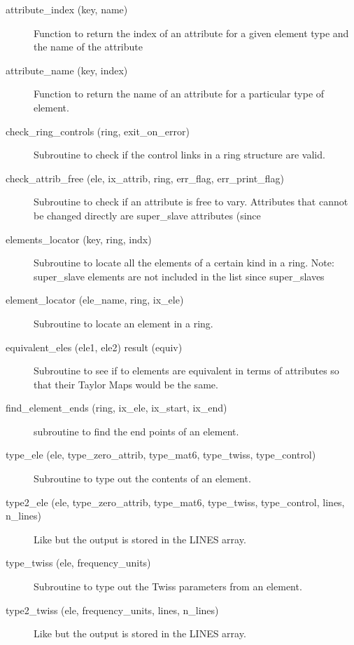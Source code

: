 \begin{description}

\item[attribute\_index (key, name)] \Newline
Function to return the index of an attribute for a given element 
type and the name of the attribute 

\item[attribute\_name (key, index)] \Newline
Function to return the name of an attribute for a particular type of element. 

\item[check\_ring\_controls (ring, exit\_on\_error)] \Newline
Subroutine to check if the control links in a ring structure are valid. 

\item[check\_attrib\_free (ele, ix\_attrib, ring, err\_flag, err\_print\_flag)] \Newline
Subroutine to check if an attribute is free to vary. Attributes that 
cannot be changed directly are super\_slave attributes (since 

\item[elements\_locator (key, ring, indx)] \Newline
Subroutine to locate all the elements of a certain kind in a ring. 
Note: super\_slave elements are not included in the list since super\_slaves 

\item[element\_locator (ele\_name, ring, ix\_ele)] \Newline
Subroutine to locate an element in a ring. 

\item[equivalent\_eles (ele1, ele2) result (equiv)] \Newline 
     Subroutine to see if to elements are equivalent in terms of attributes so
     that their Taylor Maps would be the same. 

\item[find\_element\_ends (ring, ix\_ele, ix\_start, ix\_end)] \Newline
subroutine to find the end points of an element. 

\item[type\_ele (ele, type\_zero\_attrib, type\_mat6, type\_twiss, 
type\_control)] \Newline
Subroutine to type out the contents of an element. 

\item[type2\_ele (ele, type\_zero\_attrib, type\_mat6, type\_twiss, 
type\_control, lines, n\_lines)] \Newline
Like  but the output is stored in the LINES array. 

\item[type\_twiss (ele, frequency\_units)] \Newline
Subroutine to type out the Twiss parameters from an element. 

\item[type2\_twiss (ele, frequency\_units, lines, n\_lines)] \Newline
Like  but the output is stored in the LINES array. 

\end{description}

